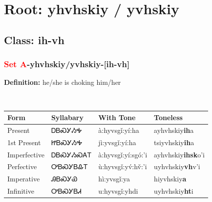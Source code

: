 \needspace{4in}
\section*{Root: yhvhskiy / yvhskiy}
\nopagebreak
{}
\needspace{3in}
\subsection*{Class: ih-vh}
\nopagebreak
\needspace{2in}
\subsubsection*{\textcolor{Red}{Set A}{-}\textbf{yhvhskiy/yvhskiy}{-}[ih-vh]}
\nopagebreak
\textbf{Definition: } he/she is choking him/her
\\[0.5em]
\begin{tabularx}{\textwidth}{l X X X}%
\toprule%
\textbf{Form}&\textbf{Syllabary}&\textbf{With Tone}&\textbf{Toneless}\\%
\midrule%
Present&ᎠᏴᏍᎩᏱᎭ&à:hyvsgǐ:yí:ha&ayhvhskiy\textbf{ih}a\\%
1st Present&ᏥᏴᏍᎩᏱᎭ&jì:yvsgǐ:yí:ha&tsiyvhskiy\textbf{ih}a\\%
Imperfective&ᎠᏴᏍᎩᏱᏍᎪᎢ&à:hyvsgǐ:yí:sgó:’i&ayhvhskiy\textbf{ihsk}o'i\\%
Perfective&ᎤᏴᏍᎩᏴᎲᎢ&ù:hyvsgǐ:yv́:hv̌:’i&uyhvhskiy\textbf{vh}v'i\\%
Imperative&ᎯᏴᏍᎩᏯ&hì:yvsgǐ:ya&hiyvhskiy\textbf{a}\\%
Infinitive&ᎤᏴᏍᎩᏴᏗ&u:hyvsgǐ:yhdi&uyhvhskiy\textbf{ht}i\\%
\bottomrule%
\end{tabularx}
\\[1em]